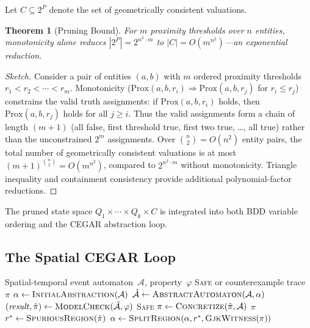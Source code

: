\documentclass[11pt,a4paper]{article}
\newtheorem{theorem}{Theorem}
\begin{document}
Let $C \subseteq 2^P$ denote the set of geometrically consistent valuations.

\begin{theorem}[Pruning Bound]\label{thm:pruning}
For $m$ proximity thresholds over $n$ entities, monotonicity alone reduces
$|2^P| = 2^{n^2 \cdot m}$ to $|C| = O(m^{n^2})$---an exponential reduction.
\end{theorem}

\begin{proof}[Sketch]
Consider a pair of entities $(a, b)$ with $m$ ordered proximity thresholds
$r_1 < r_2 < \cdots < r_m$.
Monotonicity ($\text{Prox}(a,b,r_i) \Rightarrow \text{Prox}(a,b,r_j)$ for
$r_i \leq r_j$) constrains the valid truth assignments:
if $\text{Prox}(a,b,r_i)$ holds, then $\text{Prox}(a,b,r_j)$ holds for all
$j \geq i$.
Thus the valid assignments form a chain of length $(m{+}1)$ (all false, first
threshold true, first two true, \ldots, all true) rather than the unconstrained
$2^m$ assignments.
Over $\binom{n}{2} = O(n^2)$ entity pairs, the total number of geometrically
consistent valuations is at most $(m{+}1)^{\binom{n}{2}} = O(m^{n^2})$, compared
to $2^{n^2 \cdot m}$ without monotonicity.
Triangle inequality and containment consistency provide additional polynomial-factor
reductions.
\end{proof}

The pruned state space $Q_1 \times \cdots \times Q_k \times C$ is integrated into
both BDD variable ordering and the CEGAR abstraction loop.

\subsection{The Spatial CEGAR Loop}

\begin{algorithm}[t]
\caption{Spatial CEGAR for XR Interaction Verification}
\label{alg:cegar}
\begin{algorithmic}[1]
\Require Spatial-temporal event automaton~$\mathcal{A}$, property~$\varphi$
\Ensure \textsc{Safe} or counterexample trace~$\pi$
\State $\alpha \gets \textsc{InitialAbstraction}(\mathcal{A})$
\Loop
  \State $\hat{\mathcal{A}} \gets \textsc{AbstractAutomaton}(\mathcal{A}, \alpha)$
  \State $(\mathit{result}, \hat{\pi}) \gets \textsc{ModelCheck}(\hat{\mathcal{A}},
         \varphi)$
    \Return \textsc{Safe}
  \EndIf
  \State $\pi \gets \textsc{Concretize}(\hat{\pi}, \mathcal{A})$
    \Return $\pi$ 
  \Else
    \State $r^* \gets \textsc{SpuriousRegion}(\hat{\pi})$
    \State $\alpha \gets \textsc{SplitRegion}(\alpha, r^*, \textsc{GjkWitness}(\pi))$
  \EndIf
\EndLoop
\end{algorithmic}
\end{algorithm}
\end{document}
